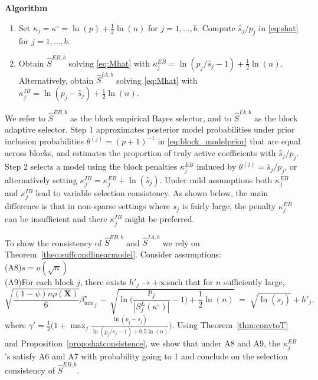 \documentclass[aos]{imsart}
\theoremstyle{plain}
\newcommand{\bs}{\boldsymbol}
\begin{document}
\textbf{Algorithm}
\begin{enumerate}
    \item Set
    $\kappa_j=\kappa^{\circ}=\ln(p)+\frac{1}{2}\ln(n)$ for $j=1,\ldots,b$. Compute $\widehat{s}_j/p_j$ in \eqref{eq:shat} for $j=1,\ldots,b$.

    \item Obtain $\hat{S}^{EB,b}$ solving \eqref{eq:Mhat} with $\kappa_j^{EB}= \ln(p_j/\widehat{s}_j -1)+ \tfrac{1}{2}\ln(n)$.
    Alternatively, obtain $\hat{S}^{IA,b}$ solving \eqref{eq:Mhat} with
    $\kappa_j^{IB} = \ln(p_j-\widehat{s}_j)+ \tfrac{1}{2}\ln(n)$.
\end{enumerate}

We refer to $\hat{S}^{EB,b}$ as the block empirical Bayes selector, and to $\hat{S}^{IA,b}$ as the block adaptive selector.
Step 1 approximates posterior model probabilities under prior inclusion probabilities $\theta^{(j)}=(p+1)^{-1}$ in \eqref{eq:block_modelprior} that are equal across blocks, and estimates the proportion of truly active coefficients with $\hat{s}_j/p_j$. Step 2 selects a model using the block penalties $\kappa_j^{EB}$ induced by $\theta^{(j)}=\hat{s}_j/p_j$,
or alternatively setting $\kappa_j^{IB}= \kappa_j^{EB} + \ln(\hat{s}_j)$.
Under mild assumptions both $\kappa_j^{EB}$ and $\kappa_j^{IB}$ lead to variable selection consistency.
As shown below, the main difference is that in non-sparse settings where $s_j$ is fairly large, the penalty $\kappa_j^{EB}$ can be insufficient and there $\kappa_j^{IB}$ might be preferred.

To show the consistency of $\hat{S}^{EB,b}$ and $\hat{S}^{IA,b}$ we rely on Theorem~\ref{theo:suffcondlinearmodel}. 
Consider assumptions:\\[5pt]
(A8)\quad $s=o(\sqrt{n})$\\[5pt]
(A9)\quad For each block $j$, there exists $h'_j\to +\infty$such that for $n$ sufficiently large, 
\begin{equation*}\label{cond:suffIIreg2}
        \sqrt{\frac{ (1-\psi)n\rho(\bs X)}{6}}{{\beta_{\min}^{\star}}_j} \,- \,\sqrt{\ln\bigg(\frac{p_j}{|S^{L}_j(\kappa^{\circ})|}-1\bigg)+\frac12\ln(n)} \;=\; \sqrt{\ln(s_j)} + h'_j .
    \end{equation*}
where $\gamma'=\frac12\big(1+\max_j \frac{\ln(p_j-s_j)}{\ln(p_j/s_j-1)+0.5\ln(n)}\big)$.
Using Theorem~\ref{thm:convtoT} and Proposition~\ref{prop:shatconsistence}, we show that under A8 and A9, the $\kappa^{EB}_j$'s satisfy A6 and A7 with probability going to 1 and conclude on the selection consistency  of $\hat{S}^{EB,b}$.
\end{document}
